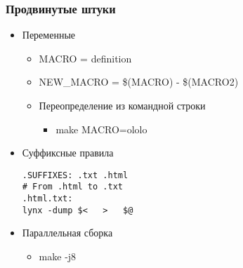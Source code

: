 \documentclass{../../slides-style}
\begin{document}
    \begin{frame}[fragile]
        \frametitle{Продвинутые штуки}
        \begin{itemize}
            \item Переменные
            \begin{itemize}
                \item MACRO = definition
                \item NEW\_MACRO = \$(MACRO) - \$(MACRO2)
                \item Переопределение из командной строки
                \begin{itemize}
                    \item make MACRO=ololo
                \end{itemize}
            \end{itemize}
            \item Суффиксные правила
            \begin{footnotesize}
                \begin{verbatim}
.SUFFIXES: .txt .html
# From .html to .txt
.html.txt:
lynx -dump $<   >   $@
                \end{verbatim}
            \end{footnotesize}
            \item Параллельная сборка
            \begin{itemize}
                \item make -j8
            \end{itemize}
        \end{itemize}
    \end{frame}
\end{document}
